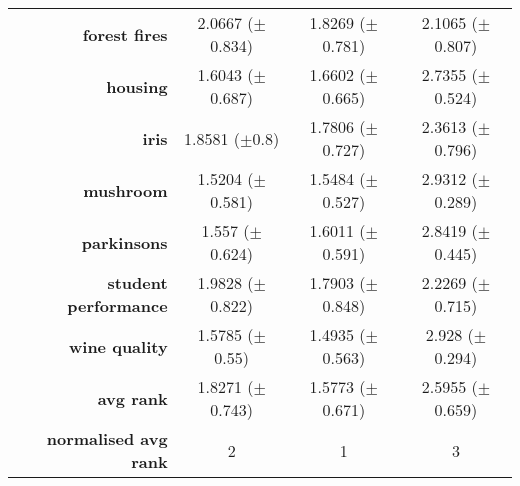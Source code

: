 \begin{table}[htbp]
{\begin{tabular}{r|ccc}
			\textbf{forest fires}        & \cellcolor[rgb]{ 1,  .922,  .518}2.0667 ($\pm$0.834)       & \cellcolor[rgb]{ .388,  .745,  .482}1.8269 ($\pm$0.781) & \cellcolor[rgb]{ .973,  .412,  .42}2.1065 ($\pm$0.807) \\
			\textbf{housing}             & \cellcolor[rgb]{ .388,  .745,  .482}1.6043 ($\pm$0.687)    & \cellcolor[rgb]{ 1,  .922,  .518}1.6602 ($\pm$0.665)    & \cellcolor[rgb]{ .973,  .412,  .42}2.7355 ($\pm$0.524) \\
			\textbf{iris}                & \cellcolor[rgb]{ 1,  .922,  .518}1.8581 ($\pm$0.8)         & \cellcolor[rgb]{ .388,  .745,  .482}1.7806 ($\pm$0.727) & \cellcolor[rgb]{ .973,  .412,  .42}2.3613 ($\pm$0.796) \\
			\textbf{mushroom}            & \cellcolor[rgb]{ .388,  .745,  .482}1.5204 ($\pm$0.581)    & \cellcolor[rgb]{ 1,  .922,  .518}1.5484 ($\pm$0.527)    & \cellcolor[rgb]{ .973,  .412,  .42}2.9312 ($\pm$0.289) \\
			\textbf{parkinsons}          & \cellcolor[rgb]{ .388,  .745,  .482}1.557 ($\pm$0.624)     & \cellcolor[rgb]{ 1,  .922,  .518}1.6011 ($\pm$0.591)    & \cellcolor[rgb]{ .973,  .412,  .42}2.8419 ($\pm$0.445) \\
			\textbf{student performance} & \cellcolor[rgb]{ 1,  .922,  .518}1.9828 ($\pm$0.822)       & \cellcolor[rgb]{ .388,  .745,  .482}1.7903 ($\pm$0.848) & \cellcolor[rgb]{ .973,  .412,  .42}2.2269 ($\pm$0.715) \\
			\textbf{wine quality}        & \cellcolor[rgb]{ 1,  .922,  .518}1.5785 ($\pm$0.55)        & \cellcolor[rgb]{ .388,  .745,  .482}1.4935 ($\pm$0.563) & \cellcolor[rgb]{ .973,  .412,  .42}2.928 ($\pm$0.294)  \\
			\midrule
			\textbf{avg rank}            & \cellcolor[rgb]{ 1,  .922,  .518}1.8271 ($\pm$0.743)       & \cellcolor[rgb]{ .388,  .745,  .482}1.5773 ($\pm$0.671) & \cellcolor[rgb]{ .973,  .412,  .42}2.5955 ($\pm$0.659) \\
			\midrule
			\textbf{normalised avg rank} & \cellcolor[rgb]{ 1,  .922,  .518}2                         & \cellcolor[rgb]{ .388,  .745,  .482}1                   & \cellcolor[rgb]{ .973,  .412,  .42}3                   \\
		\end{tabular}%
	}
\end{table}%

